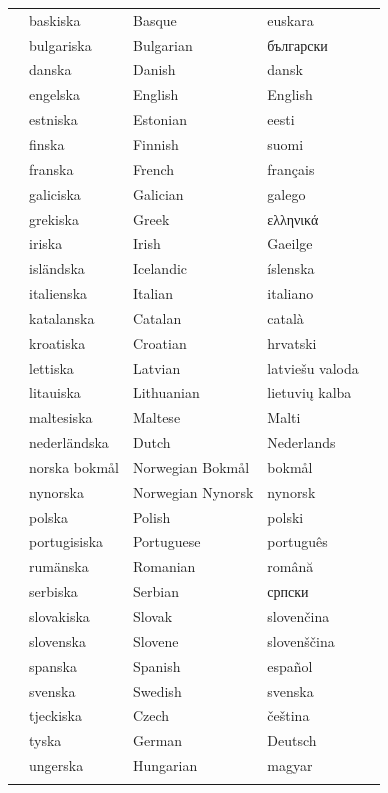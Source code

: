 \vspace*{-5mm}
\centering
  \setlength{\tabcolsep}{2.5em}
  \begin{tabularx}{\textwidth}{lllll} \toprule\addlinespace
  &baskiska & Basque & euskara\\
  &bulgariska & Bulgarian & български\\
  &danska & Danish & dansk\\
  &engelska & English & English\\
  &estniska & Estonian & eesti\\
  &finska & Finnish & suomi\\
  &franska & French & français\\
  &galiciska & Galician & galego\\
  &grekiska & Greek & ελληνικά\\
  &iriska & Irish & Gaeilge\\
  &isländska & Icelandic & íslenska\\
  &italienska & Italian & italiano\\
  &katalanska & Catalan & català\\
  &kroatiska & Croatian & hrvatski\\
  &lettiska & Latvian & latviešu valoda\\
  &litauiska & Lithuanian & lietuvių kalba\\
  &maltesiska & Maltese & Malti\\
  &nederländska & Dutch & Nederlands\\
  &norska bokmål & Norwegian Bokmål & bokmål\\
  &nynorska & Norwegian Nynorsk & nynorsk\\
  &polska & Polish & polski\\
  &portugisiska & Portuguese & português\\
  &rumänska & Romanian & română\\
  &serbiska & Serbian & српски\\
  &slovakiska & Slovak & slovenčina\\
  &slovenska & Slovene & slovenščina\\
  &spanska & Spanish & español\\
  &svenska & Swedish & svenska\\
  &tjeckiska & Czech & čeština\\
  &tyska & German & Deutsch\\
  &ungerska & Hungarian & magyar\\ \addlinespace \bottomrule
\end{tabularx}
